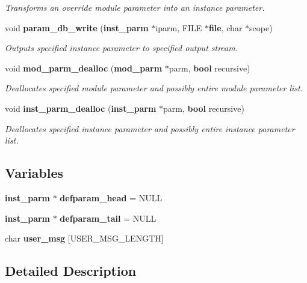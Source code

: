 \begin{CompactItemize}
\begin{CompactList}\small\item\em Transforms an override module parameter into an instance parameter.\item\end{CompactList}\item 
void {\bf param\_\-db\_\-write} ({\bf inst\_\-parm} $\ast$iparm, FILE $\ast${\bf file}, char $\ast$scope)
\begin{CompactList}\small\item\em Outputs specified instance parameter to specified output stream.\item\end{CompactList}\item 
void {\bf mod\_\-parm\_\-dealloc} ({\bf mod\_\-parm} $\ast$parm, {\bf bool} recursive)
\begin{CompactList}\small\item\em Deallocates specified module parameter and possibly entire module parameter list.\item\end{CompactList}\item 
void {\bf inst\_\-parm\_\-dealloc} ({\bf inst\_\-parm} $\ast$parm, {\bf bool} recursive)
\begin{CompactList}\small\item\em Deallocates specified instance parameter and possibly entire instance parameter list.\item\end{CompactList}\end{CompactItemize}
\subsection*{Variables}
\begin{CompactItemize}
\item 
{\bf inst\_\-parm} $\ast$ {\bf defparam\_\-head} = NULL
\item 
{\bf inst\_\-parm} $\ast$ {\bf defparam\_\-tail} = NULL
\item 
char {\bf user\_\-msg} [USER\_\-MSG\_\-LENGTH]
\end{CompactItemize}


\subsection{Detailed Description}


